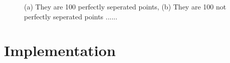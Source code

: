 \documentclass[a4paper]{article}
\begin{document}
\begin{figure}[!htb]
\begin{center}

\caption{(a) They are 100 perfectly seperated points, (b) They are 100 not perfectly seperated points ...... }
\label{fig1}
\end{center}
\end{figure}


\section{Implementation}
\end{document}
